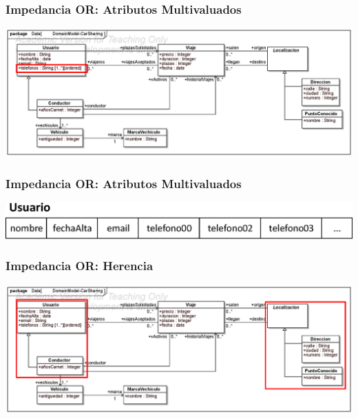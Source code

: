 \documentclass[a4paper,slidestop,xcolor=pst,blue]{beamer}
\begin{document}

\begin{frame}[c]
    \frametitle{Impedancia OR: Atributos Multivaluados}
    \begin{center}
        \includegraphics[width=\linewidth]{images/ooMismatch/ooMismatch02.eps}
    \end{center}
\end{frame}

\begin{frame}[c]
    \frametitle{Impedancia OR: Atributos Multivaluados}
    \begin{center}
        \includegraphics[width=0.8\linewidth]{images/ooMismatch/ooMismatch03.eps}
    \end{center}
\end{frame}

\begin{frame}[c]
    \frametitle{Impedancia OR: Herencia}
    \begin{center}
        \includegraphics[width=\linewidth]{images/ooMismatch/ooMismatch04.eps}
    \end{center}
\end{frame}
\end{document}
